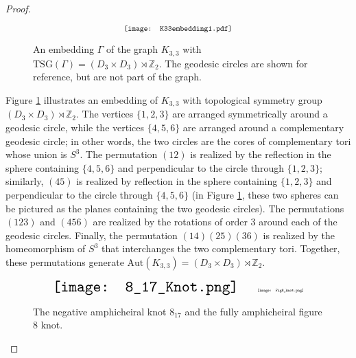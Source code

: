 \documentclass[11]{amsart}
\def\Z{\mathbb{Z}}
\newcommand{\semi}{{\rtimes}}
\def\TSG{{\mathrm{TSG}}}
\def\Aut{{\mathrm{Aut}}}
\theoremstyle{definition}
\theoremstyle{remark}
\begin{document}
\begin{proof}

\begin{figure} [htbp]
$$\scalebox{.8}{\texttt{[image: K33embedding1.pdf]}}$$
\caption{An embedding $\Gamma$ of the graph $K_{3,3}$ with $\TSG(\Gamma) = (D_3 \times D_3) \semi \Z_2$. The geodesic circles are shown for reference, but are not part of the graph.}
\label{F:K33embedding1}
\end{figure}

Figure \ref{F:K33embedding1} illustrates an embedding of $K_{3,3}$ with topological symmetry group $(D_3 \times D_3) \semi \Z_2$. The vertices $\{1, 2, 3\}$ are arranged symmetrically around a geodesic circle, while the vertices $\{4, 5, 6\}$ are arranged around a complementary geodesic circle; in other words, the two circles are the cores of complementary tori whose union is $S^3$. The permutation $(12)$ is realized by the reflection in the sphere containing $\{4, 5, 6\}$ and perpendicular to the circle through $\{1, 2, 3\}$; similarly, $(45)$ is realized by reflection in the sphere containing $\{1,2, 3\}$ and perpendicular to the circle through $\{4, 5, 6\}$ (in Figure \ref{F:K33embedding1}, these two spheres can be pictured as the planes containing the two geodesic circles).  The permutations $(123)$ and $(456)$ are realized by the rotations of order 3 around each of the geodesic circles.  Finally, the permutation $(14)(25)(36)$ is realized by the homeomorphism of $S^3$ that interchanges the two complementary tori. Together, these permutations generate $\Aut(K_{3,3}) = (D_3 \times D_3) \semi \Z_2$.

\begin{figure} [htbp]
$$\scalebox{1.6}{\texttt{[image: 8\_17\_Knot.png]}} \qquad \scalebox{.4}{\texttt{[image: Fig8\_knot.png]}}$$
\caption{The negative amphicheiral knot $8_{17}$  and the fully amphicheiral figure 8 knot. }
\label{F:knots}
\end{figure}


\end{proof}
\end{document}
